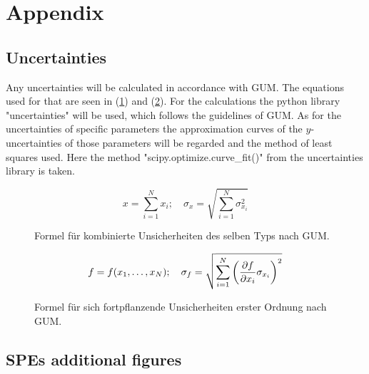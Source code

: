 \newpage
\appendix
\section{Appendix}\label{sec:appendix}

\subsection{Uncertainties}\label{sec:uncertainties}

Any uncertainties will be calculated in accordance with GUM.
The equations used for that are seen in (\ref{fig:GUM_combine}) and (\ref{fig:GUM_formula}).
For the calculations the python library "uncertainties" will be used, which follows the guidelines of GUM.
As for the uncertainties of specific parameters the approximation curves of the $y$-uncertainties of those parameters will be regarded and the method of least squares used.
Here the method "scipy.optimize.curve\_fit()" from the uncertainties library is taken.

\begin{figure}[ht]
	\begin{equation*}
	x = \sum_{i=1}^{N} x_i
	;\quad
	\sigma_x = \sqrt{\sum_{i = 1}^{N} \sigma_{x_i}^2}
	\end{equation*}
	\caption{Formel für kombinierte Unsicherheiten des selben Typs nach GUM.}
	\label{fig:GUM_combine}
\end{figure}

\begin{figure}[ht]
	\begin{align*}
	f = f(x_1, \dots , x_N)
	;\quad
	\sigma_f = \sqrt{\sum_{i = 1}^{N}\left(\pdv{f}{x_i} \sigma_{x_i}\right) ^2}
	\end{align*}
	\caption{Formel für sich fortpflanzende Unsicherheiten erster Ordnung nach GUM.}
	\label{fig:GUM_formula}
\end{figure}


\newpage
\subsection{SPEs additional figures}
\label{sec:anhang:spe}

